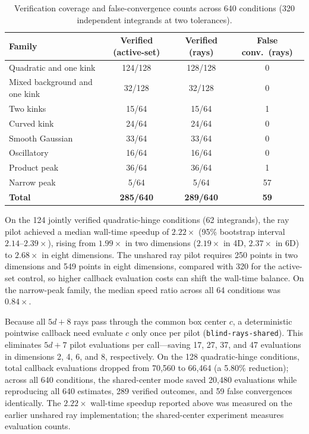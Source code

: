 \documentclass[10pt,letterpaper]{article}
\begin{document}
\begin{table}[ht]
\centering
\small
\caption{Verification coverage and false-convergence counts across 640 conditions (320 independent integrands at two tolerances).}
\label{tab:coverage}
\begin{tabularx}{\linewidth}{>{\raggedright\arraybackslash}Xccc}
\toprule
\textbf{Family} & \textbf{Verified (active-set)} & \textbf{Verified (rays)} & \textbf{False conv.\ (rays)} \\
\midrule
Quadratic and one kink & 124/128 & 128/128 & 0 \\
Mixed background and one kink & 32/128 & 32/128 & 0 \\
Two kinks & 15/64 & 15/64 & 1 \\
Curved kink & 24/64 & 24/64 & 0 \\
Smooth Gaussian & 33/64 & 33/64 & 0 \\
Oscillatory & 16/64 & 16/64 & 0 \\
Product peak & 36/64 & 36/64 & 1 \\
Narrow peak & 5/64 & 5/64 & 57 \\
\midrule
\textbf{Total} & \textbf{285/640} & \textbf{289/640} & \textbf{59} \\
\bottomrule
\end{tabularx}
\end{table}

On the 124 jointly verified quadratic-hinge conditions (62 integrands), the ray pilot achieved a median wall-time speedup of $2.22\times$ (95\% bootstrap interval $2.14\text{--}2.39\times$), rising from $1.99\times$ in two dimensions ($2.19\times$ in 4D, $2.37\times$ in 6D) to $2.68\times$ in eight dimensions. The unshared ray pilot requires 250 points in two dimensions and 549 points in eight dimensions, compared with 320 for the active-set control, so higher callback evaluation costs can shift the wall-time balance. On the narrow-peak family, the median speed ratio across all 64 conditions was $0.84\times$.

Because all $5d + 8$ rays pass through the common box center $c$, a deterministic pointwise callback need evaluate $c$ only once per pilot (\texttt{blind-rays-shared}). This eliminates $5d + 7$ pilot evaluations per call---saving 17, 27, 37, and 47 evaluations in dimensions 2, 4, 6, and 8, respectively. On the 128 quadratic-hinge conditions, total callback evaluations dropped from 70,560 to 66,464 (a 5.80\% reduction); across all 640 conditions, the shared-center mode saved 20,480 evaluations while reproducing all 640 estimates, 289 verified outcomes, and 59 false convergences identically. The $2.22\times$ wall-time speedup reported above was measured on the earlier unshared ray implementation; the shared-center experiment measures evaluation counts.
\end{document}
